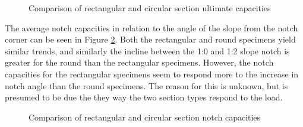 \documentclass[11pt,a4paper]{article}
\numberwithin{equation}{subsection}
\begin{document}
\vspace*{\baselineskip}

\begin{figure}[h]
	\begin{center}
	\end{center}
	\caption{Comparison of rectangular and circular section ultimate capacities}
	\label{fig:compare_cap}
\end{figure}

\noindent
The average notch capacities in relation to the angle of the slope from the notch corner can be seen in Figure \ref{fig:compare_not}. Both the rectangular and round specimens yield similar trends, and similarly the incline between the 1:0 and 1:2 slope notch is greater for the round than the rectangular specimens. However, the notch capacities for the rectangular specimens seem to respond more to the increase in notch angle than the round specimens. The reason for this is unknown, but is presumed to be due the they way the two section types respond to the load.

\vspace*{\baselineskip}

\begin{figure}[h]
	\begin{center}
	\end{center}
	\caption{Comparison of rectangular and circular section notch capacities}
	\label{fig:compare_not}
\end{figure}
\end{document}
